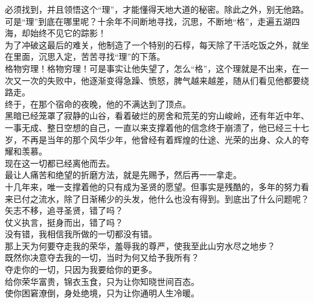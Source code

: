 \begin{multicols}{\theparacolNo}
必须找到，并且领悟这个“理”，才能懂得天地大道的秘密。除此之外，别无他路。\\

可是“理”到底在哪里呢？十余年不间断地寻找，沉思，不断地“格”，走遍五湖四海，却始终不见它的踪影！\\

为了冲破这最后的难关，他制造了一个特别的石椁，每天除了干活吃饭之外，就坐在里面，沉思入定，苦苦寻找“理”的下落。\\

格物穷理！格物穷理！可是事实让他失望了，怎么“格”，这个理就是不出来，在一次又一次的失败中，他逐渐变得急躁、愤怒，脾气越来越差，随从们看见他都要绕路走。\\

终于，在那个宿命的夜晚，他的不满达到了顶点。\\

黑暗已经笼罩了寂静的山谷，看着破烂的房舍和荒芜的穷山峻岭，还有年近中年、一事无成、整日空想的自己，一直以来支撑着他的信念终于崩溃了，他已经三十七岁，不再是当年的那个风华少年，他曾经有着辉煌的仕途、光荣的出身、众人的夸耀和羡慕。\\

现在这一切都已经离他而去。\\

最让人痛苦和绝望的折磨方法，就是先赐予，然后再一一拿走。\\

十几年来，唯一支撑着他的只有成为圣贤的愿望。但事实是残酷的，多年的努力看来已付之流水，除了日渐稀少的头发，他什么也没有得到。到底出了什么问题呢？\\

矢志不移，追寻圣贤，错了吗？\\

仗义执言，挺身而出，错了吗？\\

没有错，我相信我所做的一切都没有错。\\

那上天为何要夺走我的荣华，羞辱我的尊严，使我至此山穷水尽之地步？\\

既然你决意夺去我的一切，当时为何又给予我所有？\\

夺走你的一切，只因为我要给你的更多。\\

给你荣华富贵，锦衣玉食，只为让你知晓世间百态。\\

使你困窘潦倒，身处绝境，只为让你通明人生冷暖。\\


\end{multicols}
